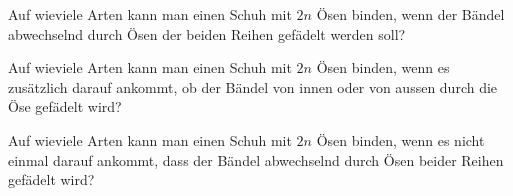 \begin{center}
\end{center}

\begin{teilaufgaben}
\item
Auf wieviele Arten kann man einen Schuh mit $2n$ Ösen binden, wenn der
Bändel abwechselnd durch Ösen der beiden Reihen gefädelt werden soll?
\item
Auf wieviele Arten kann man einen Schuh mit $2n$ Ösen binden, wenn
es zusätzlich darauf ankommt, ob der Bändel von innen oder von aussen
durch die Öse gefädelt wird?
\item
Auf wieviele Arten kann man einen Schuh mit $2n$ Ösen binden,
wenn es nicht einmal darauf ankommt, dass der Bändel abwechselnd
durch Ösen beider Reihen gefädelt wird?
\end{teilaufgaben}

